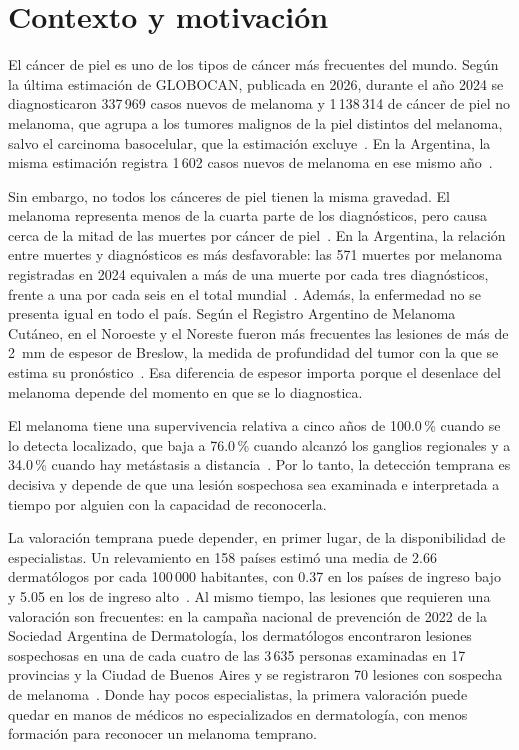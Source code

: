 \section{Contexto y motivación}
\label{sec:intro_contexto}

El cáncer de piel es uno de los tipos de cáncer más frecuentes del mundo. Según la última estimación de
GLOBOCAN, publicada en 2026, durante el año 2024 se diagnosticaron 337\,969 casos nuevos de melanoma y
1\,138\,314 de cáncer de piel no melanoma, que agrupa a los tumores malignos de la piel distintos del melanoma, salvo el carcinoma basocelular, que la estimación excluye~\cite{sung2026global}. En la Argentina, la misma
estimación registra 1\,602 casos nuevos de melanoma en ese mismo año~\cite{ervik2026cancertoday}.

Sin embargo, no todos los cánceres de piel tienen la misma gravedad. El melanoma representa menos de la cuarta
parte de los diagnósticos, pero causa cerca de la mitad de las muertes por cáncer de piel~\cite{sung2026global}.
En la Argentina, la relación entre muertes y diagnósticos es más desfavorable: las 571 muertes por melanoma
registradas en 2024 equivalen a más de una muerte por cada tres diagnósticos, frente a una por cada seis en el total
mundial~\cite{ervik2026cancertoday,sung2026global}. Además, la enfermedad no se presenta igual en todo el país. Según el
Registro Argentino de Melanoma Cutáneo, en el Noroeste y el Noreste fueron más frecuentes las lesiones de más
de 2~mm de espesor de Breslow, la medida de profundidad del tumor con la que se estima su
pronóstico~\cite{loria2020cutaneous}. Esa diferencia de espesor importa porque el desenlace del melanoma depende del momento en que se lo diagnostica.

El melanoma tiene una supervivencia relativa a cinco años de 100.0\,\% cuando se lo detecta localizado, que baja a
76.0\,\% cuando alcanzó los ganglios regionales y a 34.0\,\% cuando hay metástasis a
distancia~\cite{nci2026melanoma}. Por lo tanto, la detección temprana es decisiva y depende de que una lesión
sospechosa sea examinada e interpretada a tiempo por alguien con la capacidad de reconocerla.

La valoración temprana puede depender, en primer lugar, de la disponibilidad de especialistas. Un
relevamiento en 158 países estimó una media de 2.66 dermatólogos por cada 100\,000 habitantes, con 0.37 en los
países de ingreso bajo y 5.05 en los de ingreso alto~\cite{freeman2026global}. Al mismo tiempo, las lesiones que
requieren una valoración son frecuentes: en la campaña nacional de prevención de 2022 de la Sociedad Argentina
de Dermatología, los dermatólogos encontraron lesiones sospechosas en una de cada cuatro de las 3\,635
personas examinadas en 17 provincias y la Ciudad de Buenos Aires y se registraron 70 lesiones con sospecha de
melanoma~\cite{sad2023campana}. Donde hay pocos especialistas, la primera valoración puede quedar en manos de médicos no especializados en dermatología, con menos formación para reconocer un melanoma temprano.

